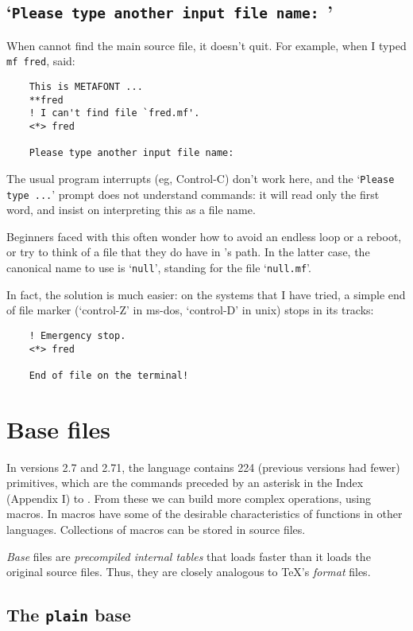 \subsection{`{\tt Please type another input file name: }'}%
\label{sub:another}

When \MF{} cannot find the main source file, it doesn't quit.
For example, when I typed {\tt mf fred}, \MF{} said:
\begin{verbatim}
    This is METAFONT ...
    **fred
    ! I can't find file `fred.mf'.
    <*> fred

    Please type another input file name:
\end{verbatim}
The usual program interrupts (eg, Control-C) don't work here,
and the `{\tt Please type ...}' prompt does not understand
\MF{} commands:  it will read only the first word, and insist on
interpreting this as a file name.

Beginners faced with this often wonder how to avoid an endless loop
or a reboot, or try to think of a \MF{} file that they do have
in \MF{}'s path.  In the latter case, the canonical name to use
is `{\tt null}', standing for the file `{\tt null.mf}'.

In fact, the solution is much easier:  on the
systems that I have tried, a simple end of file marker
(`control-Z' in {\sc ms-dos}, `control-D' in {\sc unix})
stops \MF{} in its tracks:
\begin{verbatim}
    ! Emergency stop.
    <*> fred

    End of file on the terminal!
\end{verbatim}


\section{Base files}\label{sec:base}

In versions 2.7 and 2.71, the \MF{} language contains 224
(previous versions had fewer) primitives,
which are the commands preceded by an asterisk in the Index (Appendix I)
to \MFbook{}.  From these we can build more complex operations,
using macros.  In \MF{} macros have some of the desirable
characteristics of functions in other languages.  Collections of
macros can be stored in \MF{} source files.

{\em Base\/} files are {\em precompiled internal tables\/} that \MF{}
loads faster than it loads the original \MF{} source files.
Thus, they are closely analogous to \TeX{}'s {\em format\/} files.


\subsection{The {\tt plain} base}\label{sub:plain}

